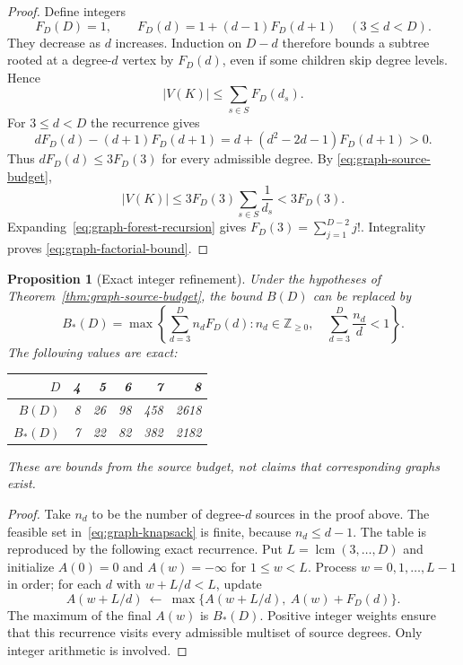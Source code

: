 \documentclass[11pt,a4paper]{article}
\newtheorem{proposition}[theorem]{Proposition}
\theoremstyle{definition}\newtheorem{definition}[theorem]{Definition}
\theoremstyle{remark}\newtheorem{remark}[theorem]{Remark}
\begin{document}
\begin{proof}
Define integers
\begin{equation}\label{eq:graph-forest-recursion}
 F_D(D)=1,\qquad
 F_D(d)=1+(d-1)F_D(d+1)\quad(3\le d<D).
\end{equation}
They decrease as $d$ increases. Induction on $D-d$ therefore bounds a
subtree rooted at a degree-$d$ vertex by $F_D(d)$, even if some children
skip degree levels. Hence
\[
 |V(K)|\le\sum_{s\in S}F_D(d_s).
\]
For $3\le d<D$ the recurrence gives
\[
 dF_D(d)-(d+1)F_D(d+1)
 =d+(d^2-2d-1)F_D(d+1)>0.
\]
Thus $dF_D(d)\le3F_D(3)$ for every admissible degree. By
\eqref{eq:graph-source-budget},
\[
 |V(K)|\le3F_D(3)\sum_{s\in S}\frac1{d_s}<3F_D(3).
\]
Expanding~\eqref{eq:graph-forest-recursion} gives
$F_D(3)=\sum_{j=1}^{D-2}j!$. Integrality proves
\eqref{eq:graph-factorial-bound}.
\end{proof}

\begin{proposition}[Exact integer refinement]
\label{prop:graph-knapsack}
Under the hypotheses of Theorem~\ref{thm:graph-source-budget}, the bound
$B(D)$ can be replaced by
\begin{equation}\label{eq:graph-knapsack}
 B_*(D)=\max\left\{
 \sum_{d=3}^D n_dF_D(d):
 n_d\in\mathbb Z_{\ge0},\quad
 \sum_{d=3}^D\frac{n_d}{d}<1
 \right\}.
\end{equation}
The following values are exact:
\begin{center}
\begin{tabular}{r|rrrrr}
$D$&4&5&6&7&8\\\hline
$B(D)$&8&26&98&458&2618\\
$B_*(D)$&7&22&82&382&2182
\end{tabular}
\end{center}
These are bounds from the source budget, not claims that corresponding
graphs exist.
\end{proposition}
\begin{proof}
Take $n_d$ to be the number of degree-$d$ sources in the proof above.
The feasible set in~\eqref{eq:graph-knapsack} is finite, because
$n_d\le d-1$. The table is reproduced by the following exact recurrence.
Put $L=\operatorname{lcm}(3,\ldots,D)$ and initialize $A(0)=0$ and
$A(w)=-\infty$ for $1\le w<L$. Process $w=0,1,\ldots,L-1$ in order;
for each $d$ with $w+L/d<L$, update
\[
 A(w+L/d)\ \leftarrow\
 \max\{A(w+L/d),\ A(w)+F_D(d)\}.
\]
The maximum of the final $A(w)$ is $B_*(D)$. Positive integer weights
ensure that this recurrence visits every admissible multiset of source
degrees. Only integer arithmetic is involved.
\end{proof}
\end{document}
